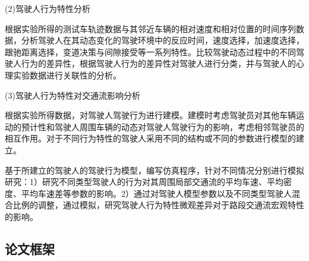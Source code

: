 (2)驾驶人行为特性分析

根据实验所得的测试车轨迹数据与其邻近车辆的相对速度和相对位置的时间序列数据，分析驾驶人在其动态变化的驾驶环境中的反应时间，速度选择，加速度选择，跟驰距离选择，变道决策与间隙接受等一系列特性。比较驾驶动态过程中的不同驾驶人行为的差异性，根据驾驶人行为的差异性对驾驶人进行分类，并与驾驶人的心理实验数据进行关联性的分析。

(3)驾驶人行为特性对交通流影响分析

根据实验所得数据，对驾驶人驾驶行为进行建模。建模时考虑驾驶员对其他车辆运动的预计性和驾驶人周围车辆的动态对驾驶人驾驶行为的影响，考虑相邻驾驶员的相互作用。对于不同行为特性的驾驶人采用不同的结构或不同的参数进行模型的建立。

基于所建立的驾驶人的驾驶行为模型，编写仿真程序，针对不同情况分别进行模拟研究：1）研究不同类型驾驶人的行为对其周围局部交通流的平均车速、平均密度、平均车速差等参数的影响。2）通过对驾驶人模型参数以及不同类型驾驶人混合比例的调整，通过模拟，研究驾驶人行为特性微观差异对于路段交通流宏观特性的影响。




\subsection{论文框架}

